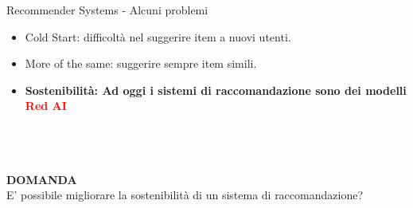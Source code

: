 \begin{frame}{Recommender Systems -  Alcuni problemi}
\begin{itemize}
    \item Cold Start: difficoltà nel suggerire item a nuovi utenti.
    \item More of the same: suggerire sempre item simili.
    \item \textbf{Sostenibilità: Ad oggi i sistemi di raccomandazione sono dei modelli \textcolor{red}{Red AI}}
\end{itemize}

\textcolor{white}{\textbf{.}}\\
\textcolor{white}{\textbf{.}}\\
\textcolor{white}{\textbf{.}}\\
\textbf{DOMANDA}\\
E' possibile migliorare la sostenibilità di un sistema di raccomandazione?
\end{frame}
